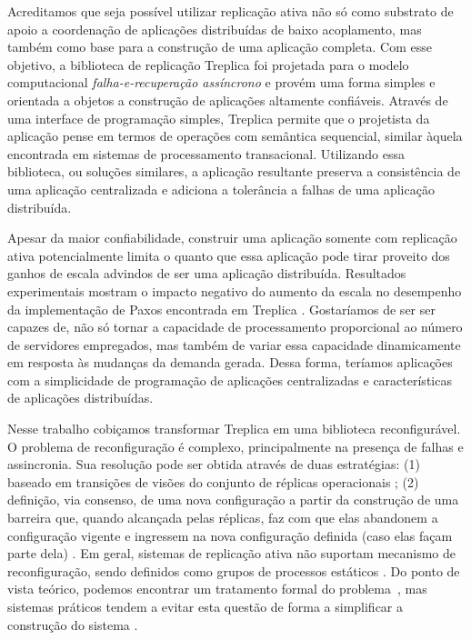 Acreditamos que seja possível utilizar replicação ativa não só como substrato de apoio a
coordenação de aplicações distribuídas de baixo acoplamento, mas também como base para a
construção de uma aplicação completa. Com esse objetivo, a biblioteca de replicação
Treplica \cite{vieira08a, vieira-tr10b} foi projetada para o modelo computacional
\emph{falha-e-recuperação assíncrono} e provém uma forma simples e orientada a objetos a
construção de aplicações altamente confiáveis. Através de uma interface de programação
simples, Treplica permite que o projetista da aplicação pense em termos de operações com
semântica sequencial, similar àquela encontrada em sistemas de processamento transacional.
Utilizando essa biblioteca, ou soluções similares, a aplicação resultante preserva a
consistência de uma aplicação centralizada e adiciona a tolerância a falhas de uma
aplicação distribuída.

Apesar da maior confiabilidade, construir uma aplicação somente com replicação ativa
potencialmente limita o quanto que essa aplicação pode tirar proveito dos ganhos de escala
advindos de ser uma aplicação distribuída. Resultados experimentais mostram o impacto
negativo do aumento da escala no desempenho da implementação de Paxos encontrada em
Treplica \cite{vieira09}. Gostaríamos de ser ser capazes de, não só tornar a capacidade de
processamento proporcional ao número de servidores empregados, mas também de variar essa
capacidade dinamicamente em resposta às mudanças da demanda gerada. Dessa forma, teríamos
aplicações com a simplicidade de programação de aplicações centralizadas e características
de aplicações distribuídas.

Nesse trabalho cobiçamos transformar Treplica em uma biblioteca reconfigurável. O problema
de reconfiguração é complexo, principalmente na presença de falhas e assincronia. Sua
resolução pode ser obtida através de duas estratégias: (1) baseado em transições de visões
do conjunto de réplicas operacionais \cite{birman87a, birman87b}; (2) definição, via
consenso, de uma nova configuração a partir da construção de uma barreira que, quando
alcançada pelas réplicas, faz com que elas abandonem a configuração vigente e ingressem na
nova configuração definida (caso elas façam parte dela) \cite{lamport10}. Em geral,
sistemas de replicação ativa não suportam mecanismo de reconfiguração, sendo definidos
como grupos de processos estáticos \cite{chandra96, lamport98}. Do ponto de vista teórico,
podemos encontrar um tratamento formal do problema~\cite{lamport10}, mas sistemas práticos
tendem a evitar esta questão de forma a simplificar a construção do sistema
\cite{chandra07}.

